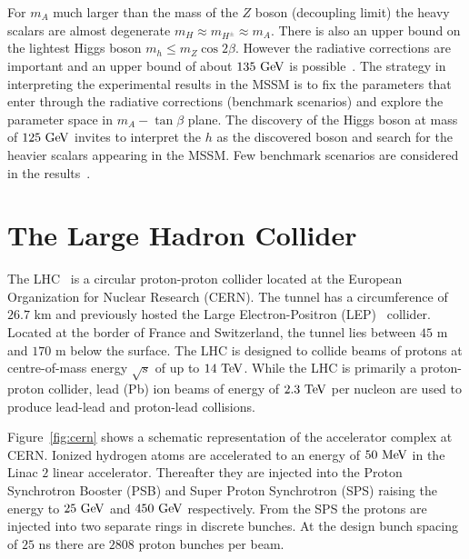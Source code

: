 For $m_{A}$ much larger than the mass of the $Z$ boson (decoupling limit) the heavy scalars are almost degenerate $m_{H} \approx m_{H^{\pm}} \approx m_{A}$. There is also an upper bound on the lightest Higgs boson $m_{h} \leq m_{Z} \cos 2\beta$. However the radiative corrections are important and an upper bound of about $135~\mathrm{Ge\kern -0.1em V}$ is possible~\cite{Degrassi:2002fi}. The strategy in interpreting the experimental results in the MSSM is to fix the parameters that enter through the radiative corrections (benchmark scenarios) and explore the parameter space in $m_{A}-\tan \beta$ plane. The discovery of the Higgs boson at mass of $125~\mathrm{Ge\kern -0.1em V}$ invites to interpret the $h$ as the discovered boson and search for the heavier scalars appearing in the MSSM. Few benchmark scenarios are considered in the results~\cite{Heinemeyer:2011aa,Carena:2013ytb}.

\section{The Large Hadron Collider}
The LHC~\cite{1748-0221-3-08-S08001} is a circular proton-proton collider located at the European Organization for Nuclear Research (CERN). The tunnel has a circumference of $26.7$ km and previously hosted the Large Electron-Positron (LEP)~\cite{lep1,lep2} collider. Located at the border of France and Switzerland, the tunnel lies between $45$ m and $170$ m below the surface. The LHC is designed to collide beams of protons at centre-of-mass energy $\sqrt{s}$ of up to $14~\mathrm{Te\kern -0.1em V}$. While the LHC is primarily a proton-proton collider, lead (Pb) ion beams of energy of $2.3~\mathrm{Te\kern -0.1em V}$ per nucleon are used to produce lead-lead  and proton-lead collisions.  
 
Figure~\ref{fig:cern} shows a schematic representation of the accelerator complex at CERN. Ionized hydrogen atoms are accelerated to an energy of $50~\mathrm{Me\kern -0.1em V}$ in the Linac $2$ linear accelerator. Thereafter they are injected into the Proton Synchrotron Booster (PSB) and Super Proton Synchrotron (SPS) raising the energy to $25~\mathrm{Ge\kern -0.1em V}$ and $450~\mathrm{Ge\kern -0.1em V}$ respectively. From the SPS the protons are injected into two separate rings in discrete bunches. At the design bunch spacing of $25$ ns there are $2808$ proton bunches per beam. 

